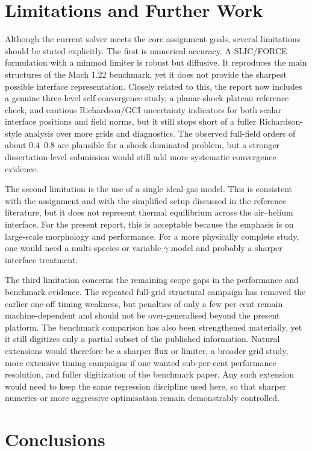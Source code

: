 \documentclass[final,3p,times,twocolumn]{elsarticle}
\begin{document}
\section{Limitations and Further Work}

Although the current solver meets the core assignment goals, several limitations should be stated explicitly. The first is numerical accuracy. A SLIC/FORCE formulation with a minmod limiter is robust but diffusive. It reproduces the main structures of the Mach 1.22 benchmark, yet it does not provide the sharpest possible interface representation. Closely related to this, the report now includes a genuine three-level self-convergence study, a planar-shock plateau reference check, and cautious Richardson/GCI uncertainty indicators for both scalar interface positions and field norms, but it still stops short of a fuller Richardson-style analysis over more grids and diagnostics. The observed full-field orders of about $0.4$--$0.8$ are plausible for a shock-dominated problem, but a stronger dissertation-level submission would still add more systematic convergence evidence.

The second limitation is the use of a single ideal-gas model. This is consistent with the assignment and with the simplified setup discussed in the reference literature, but it does not represent thermal equilibrium across the air--helium interface. For the present report, this is acceptable because the emphasis is on large-scale morphology and performance. For a more physically complete study, one would need a multi-species or variable-$\gamma$ model and probably a sharper interface treatment.

The third limitation concerns the remaining scope gaps in the performance and benchmark evidence. The repeated full-grid structural campaign has removed the earlier one-off timing weakness, but penalties of only a few per cent remain machine-dependent and should not be over-generalised beyond the present platform. The benchmark comparison has also been strengthened materially, yet it still digitizes only a partial subset of the published information. Natural extensions would therefore be a sharper flux or limiter, a broader grid study, more extensive timing campaigns if one wanted sub-per-cent performance resolution, and fuller digitization of the benchmark paper. Any such extension would need to keep the same regression discipline used here, so that sharper numerics or more aggressive optimisation remain demonstrably controlled.

\section{Conclusions}
\end{document}
